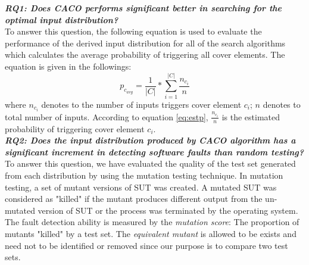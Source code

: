 \documentclass[journal]{IEEEtran}
\begin{document}
\textbf{\emph{RQ1: Does CACO performs significant better in searching for the optimal input distribution?}}\\
To answer this question, the following equation is used to evaluate the performance of the derived input distribution for all of the search algorithms which calculates the average probability of triggering all cover elements. The equation is given in the followings:
\[\label{eq:pavg}p_{c_{avg}} =  \frac{1}{|C|}*\sum_{i=1}^{|C|}\frac{n_{c_{i}}}{n}\]
where \(n_{c_{i}}\) denotes to the number of inputs triggers cover element \(c_{i}\); \(n\) denotes to total number of inputs. According to equation \ref{eq:estp}, \(\frac{n_{c_{i}}}{n}\) is the estimated probability of triggering cover element \(c_{i}\).\\
\textbf{\emph{RQ2: Does the input distribution produced by CACO algorithm has a significant increment in detecting software faults than random testing?}}\\
To answer this question, we have evaluated the quality of the test set generated from each distribution by using the mutation testing technique. In mutation testing, a set of mutant versions of SUT was created. A mutated SUT was considered as "killed" if the mutant produces different output from the un-mutated version of SUT or the process was terminated by the operating system. The fault detection ability is measured by the \emph{mutation score}: The proportion of mutants "killed" by a test set. The \emph{equivalent mutant} is allowed to be exists and need not to be identified or removed since our purpose is to compare two test sets.\\
\end{document}
